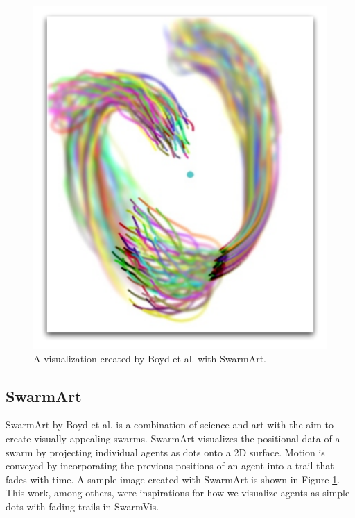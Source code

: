 \documentclass{vgtc}
\begin{document}
\begin{figure}
\centering
\includegraphics[scale=.333333]{images/SwarmArt.pdf}
\caption{A visualization created by Boyd et al. with SwarmArt\cite{Boyd}.}
\label{SwarmArt}
\end{figure}

\subsection{SwarmArt}
SwarmArt\cite{Boyd} by Boyd et al. is a combination of science and art with the aim to create visually appealing swarms.
SwarmArt visualizes the positional data of a swarm by projecting individual agents as dots onto a 2D surface.
Motion is conveyed by incorporating the previous positions of an agent into a trail that fades with time.
A sample image created with SwarmArt is shown in Figure \ref{SwarmArt}.
This work, among others\cite{codeswarm:website}, were inspirations for how we visualize agents as simple dots with fading trails
in SwarmVis.
\end{document}
